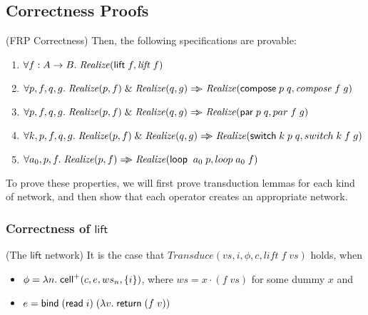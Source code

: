 \subsection{Correctness Proofs}

\begin{prop}{(FRP Correctness)}
Then, the following specifications are provable: 
\begin{enumerate}
\item $\forall f:A\to B.\; \mathit{Realize}(\mathsf{lift}\; f, \mathit{lift}\;f)$
\item $\forall p, f, q, g.\;\mathit{Realize}(p, f) \;\&\; \mathit{Realize}(q, g) \Rightarrow\!\!\!> \mathit{Realize}(\mathsf{compose}\; p\;q, \mathit{compose}\;f\;g)$
\item $\forall p, f, q, g.\;\mathit{Realize}(p, f) \;\&\; \mathit{Realize}(q, g)
                       \Rightarrow\!\!\!> \mathit{Realize}(\mathsf{par}\; p\;q, par\;f\;g)$
\item $\forall k, p, f, q, g.\;\mathit{Realize}(p, f) \;\&\; \mathit{Realize}(q, g)
                          \Rightarrow\!\!\!> \mathit{Realize}(\mathsf{switch}\; k\;p\;q, switch\;k\;f\;g)$
\item $\forall a_0, p, f.\; \mathit{Realize}(p, f) \Rightarrow\!\!\!> \mathit{Realize}(\mathsf{loop}\;\;a_0\;p, loop\;a_0\;f)$
\end{enumerate}

\end{prop}

\noindent To prove these properties, we will first prove transduction lemmas for each kind of 
network, and then show that each operator creates an appropriate network. 

\subsubsection{Correctness of $\mathsf{lift}$}

\begin{lemma}{(The $\mathsf{lift}$ network)}
It is the case that $\mathit{Transduce}(vs, i, \phi, c, \mathit{lift}\;f\;vs)$ holds, when
\begin{itemize}
\item $\phi = \lambda n.\;\mathsf{cell}^{+}({c}, {e}, {ws_n}, {\{{i}\}})$, where $ws = x \cdot (f\;vs)$ for some dummy $x$ and
\item $e = \mathsf{bind}\; (\mathsf{read}\; i)\; (\lambda v.\;\mathsf{return}\; (f\;v))$
\end{itemize}
\end{lemma}

